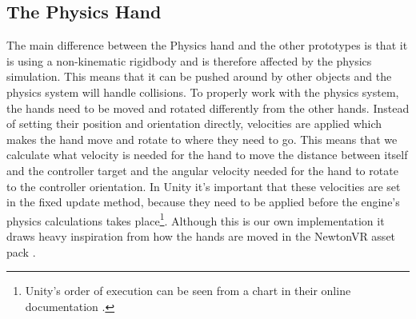 \subsection{The Physics Hand}
\label{subsec:physicsHand}
The main difference between the Physics hand and the other prototypes is that it is using a non-kinematic rigidbody and is therefore affected by the physics simulation. This means that it can be pushed around by other objects and the physics system will handle collisions. To properly work with the physics system, the hands need to be moved and rotated differently from the other hands. Instead of setting their position and orientation directly, velocities are applied which makes the hand move and rotate to where they need to go. This means that we calculate what velocity is needed for the hand to move the distance between itself and the controller target and the angular velocity needed for the hand to rotate to the controller orientation. In Unity it's important that these velocities are set in the fixed update method, because they need to be applied before the engine's physics calculations takes place\footnote{Unity's order of execution can be seen from a chart in their online documentation \parencite{UnityExecutionOrder2017}.}. Although this is our own implementation it draws heavy inspiration from how the hands are moved in the NewtonVR asset pack \parencite{TomorrowTodayLabs2016}.

